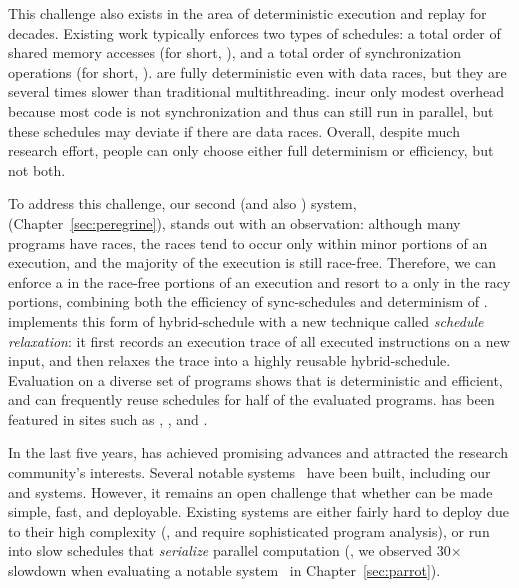 This challenge also exists in the area of deterministic
execution and replay for decades. Existing work typically enforces two types of
schedules: a total order of shared memory accesses (for short, \memsched), and a
total order of synchronization operations (for short, \syncsched). \Memscheds 
are fully deterministic even with data races, but they are several
times slower than traditional multithreading. \Syncscheds incur only modest
overhead because most code is not synchronization and thus can still run in
parallel, but these schedules may deviate if there are data races. Overall,
despite much research effort, people can only choose either full determinism 
or efficiency, but not both.

To address this challenge, our second \smt (and also \dmt) system,
\peregrine (Chapter~\ref{sec:peregrine}), stands out
with an observation: although many programs have races, the races tend to occur
only within minor portions of an execution, and the majority of the execution is
still race-free. Therefore, we can enforce a \syncsched in the race-free
portions of an execution and resort to a \memsched only in the racy portions,
combining both the efficiency of sync-schedules and determinism of \memscheds. 
\peregrine implements this form of hybrid-schedule with a new technique called
\emph{schedule relaxation}: it first records an execution trace of
all executed instructions on a new input, and then relaxes the trace into a
highly reusable hybrid-schedule. Evaluation on a diverse set of programs shows
that \peregrine is deterministic and efficient, and can frequently reuse
schedules for half of the evaluated programs. \peregrine has been featured in
sites such as \acmtechnews, \tgdaily, and \physorg.

 In the last
five years, \smt has achieved promising advances and attracted the research
community's interests. Several notable \smt systems~\cite{determinator:osdi10,
cui:tern:osdi10, peregrine:sosp11, dthreads:sosp11, bergan:oopsla13} have been
built, including our \tern and \peregrine systems. However, it remains an open
challenge that whether \smt can be made simple, fast, and deployable. Existing 
\smt systems are either fairly hard to deploy due to their high complexity 
(\eg, \tern and \peregrine require sophisticated program analysis), or run into 
slow schedules that \emph{serialize} parallel computation (\eg, we observed 
30$\times$ slowdown when evaluating a notable system~\cite{dthreads:sosp11} in 
Chapter~\ref{sec:parrot}).

